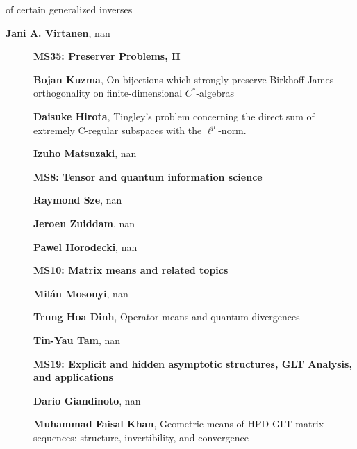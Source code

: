 \documentclass[ILAS2025-program.tex]{subfiles}
\begin{document}
\begin{description}
\begin{description}
of certain generalized inverses
        \item[\info{11:30\textrm{--}12:00}] \textbf{Jani A. Virtanen}, nan
        \end{description}
    \begin{description}
    \item[] {\color{mstitle}\textbf{MS35: Preserver Problems, II}} 
    \item[] \textbf{Bojan Kuzma}, On bijections which strongly preserve Birkhoff-James orthogonality on finite-dimensional $C^*$-algebras
        \item[] \textbf{Daisuke Hirota}, Tingley's problem concerning the direct sum of extremely C-regular subspaces with the $\ell^p$-norm.
        \item[] \textbf{Izuho Matsuzaki}, nan
        \end{description}
    \begin{description}
    \item[] {\color{mstitle}\textbf{MS8: Tensor and quantum information science}} 
    \item[] \textbf{Raymond Sze}, nan
        \item[] \textbf{Jeroen Zuiddam}, nan
        \item[] \textbf{Pawel Horodecki}, nan
        \end{description}
    \begin{description}
    \item[] {\color{mstitle}\textbf{MS10: Matrix means and related topics}} 
    \item[] \textbf{Milán Mosonyi}, nan
        \item[] \textbf{Trung Hoa Dinh}, Operator means and quantum divergences
        \item[] \textbf{Tin-Yau Tam}, nan
        \end{description}
    \begin{description}
    \item[] {\color{mstitle}\textbf{MS19: Explicit and hidden asymptotic structures, GLT Analysis, and applications}} 
    \item[] \textbf{Dario Giandinoto}, nan
        \item[] \textbf{Muhammad Faisal Khan}, Geometric means of HPD GLT matrix-sequences: structure, invertibility, and convergence

\end{description}
\end{description}
\end{document}
